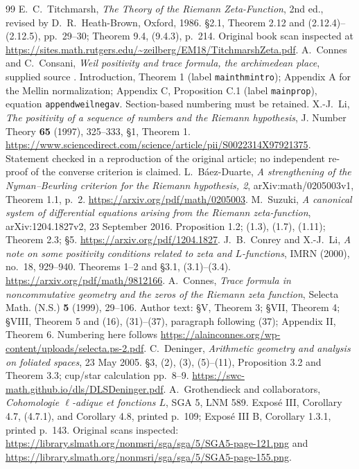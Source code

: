 \begin{thebibliography}{99}
 E.~C.~Titchmarsh, \emph{The Theory of the Riemann Zeta-Function}, 2nd ed., revised by D.~R.~Heath-Brown, Oxford, 1986. \S2.1, Theorem 2.12 and (2.12.4)--(2.12.5), pp.~29--30; Theorem 9.4, (9.4.3), p.~214. Original book scan inspected at \url{https://sites.math.rutgers.edu/~zeilberg/EM18/TitchmarshZeta.pdf}.
 A.~Connes and C.~Consani, \emph{Weil positivity and trace formula, the archimedean place}, supplied source . Introduction, Theorem 1 (label \texttt{mainthmintro}); Appendix A for the Mellin normalization; Appendix C, Proposition C.1 (label \texttt{mainprop}), equation \texttt{appendweilnegav}. Section-based numbering must be retained.
 X.-J.~Li, \emph{The positivity of a sequence of numbers and the Riemann hypothesis}, J. Number Theory \textbf{65} (1997), 325--333, \S1, Theorem 1. \url{https://www.sciencedirect.com/science/article/pii/S0022314X97921375}. Statement checked in a reproduction of the original article; no independent re-proof of the converse criterion is claimed.
 L.~B\'aez-Duarte, \emph{A strengthening of the Nyman--Beurling criterion for the Riemann hypothesis, 2}, arXiv:math/0205003v1, Theorem 1.1, p.~2. \url{https://arxiv.org/pdf/math/0205003}.
 M.~Suzuki, \emph{A canonical system of differential equations arising from the Riemann zeta-function}, arXiv:1204.1827v2, 23 September 2016. Proposition 1.2; (1.3), (1.7), (1.11); Theorem 2.3; \S5. \url{https://arxiv.org/pdf/1204.1827}.
 J.~B.~Conrey and X.-J.~Li, \emph{A note on some positivity conditions related to zeta and $L$-functions}, IMRN (2000), no.~18, 929--940. Theorems 1--2 and \S3.1, (3.1)--(3.4). \url{https://arxiv.org/pdf/math/9812166}.
 A.~Connes, \emph{Trace formula in noncommutative geometry and the zeros of the Riemann zeta function}, Selecta Math. (N.S.) \textbf{5} (1999), 29--106. Author text: \S V, Theorem 3; \S VII, Theorem 4; \S VIII, Theorem 5 and (16), (31)--(37), paragraph following (37); Appendix II, Theorem 6. Numbering here follows \url{https://alainconnes.org/wp-content/uploads/selecta.ps-2.pdf}.
 C.~Deninger, \emph{Arithmetic geometry and analysis on foliated spaces}, 23 May 2005. \S3, (2), (3), (5)--(11), Proposition 3.2 and Theorem 3.3; cup/star calculation pp.~8--9. \url{https://swc-math.github.io/dls/DLSDeninger.pdf}.
 A.~Grothendieck and collaborators, \emph{Cohomologie $\ell$-adique et fonctions $L$}, SGA 5, LNM 589. Expos\'e III, Corollary 4.7, (4.7.1), and Corollary 4.8, printed p.~109; Expos\'e III B, Corollary 1.3.1, printed p.~143. Original scans inspected: \url{https://library.slmath.org/nonmsri/sga/sga/5/SGA5-page-121.png} and \url{https://library.slmath.org/nonmsri/sga/sga/5/SGA5-page-155.png}.

\end{thebibliography}
